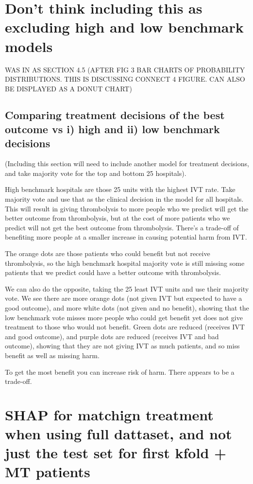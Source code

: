 \section{Don't think including this as excluding high and low benchmark models}


WAS IN AS SECTION 4.5 (AFTER FIG 3 BAR CHARTS OF PROBABILITY DISTRIBUTIONS. THIS IS DISCUSSING CONNECT 4 FIGURE. CAN ALSO BE DISPLAYED AS A DONUT CHART)
\subsection{Comparing treatment decisions of the best outcome vs i) high and ii) low benchmark decisions}
(Including this section will need to include another model for treatment decisions, and take majority vote for the top and bottom 25 hospitals).

High benchmark hospitals are those 25 units with the highest IVT rate. Take majority vote and use that as the clinical decision in the model for all hospitals. This will result in giving thrombolysis to more people who we predict will get the better outcome from thrombolysis, but at the cost of more patients who we predict will not get the best outcome from thrombolysis. There's a trade-off of benefiting more people at a smaller increase in causing potential harm from IVT. 

The orange dots are those patients who could benefit but not receive thrombolysis, so the high benchmark hospital majority vote is still missing some patients that we predict could have a better outcome with thrombolysis.

We can also do the opposite, taking the 25 least IVT units and use their majority vote. We see there are more orange dots (not given IVT but expected to have a good outcome), and more white dots (not given and no benefit), showing that the low benchmark vote misses more people who could get benefit yet does not give treatment to those who would not benefit. Green dots are reduced (receives IVT and good outcome), and purple dots are reduced (receives IVT and bad outcome), showing that they are not giving IVT as much patients, and so miss benefit as well as missing harm.

To get the most benefit you can increase risk of harm. There appears to be a trade-off.


\section{SHAP for matchign treatment when using full dattaset, and not just the test set for first kfold + MT patients}


